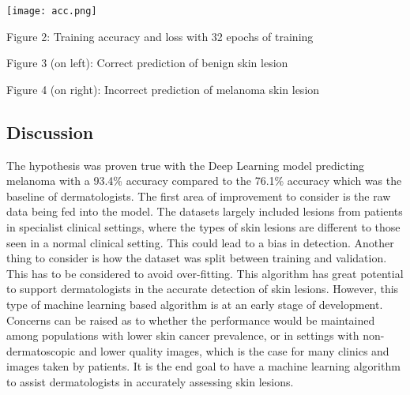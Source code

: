 \documentclass{article}
\begin{document}
\begin{center}
\texttt{[image: acc.png]}
\end{center}
Figure 2: Training accuracy and loss with 32 epochs of training

\vspace{1cm}

\begin{minipage}{16cm}
  \centering
  \hspace*{2cm}
\end{minipage}

\vspace{1cm}

Figure 3 (on left): Correct prediction of benign skin lesion

Figure 4 (on right): Incorrect prediction of melanoma skin lesion

\vspace{0.5cm}

\subsection{Discussion}
The hypothesis was proven true with the Deep Learning model predicting melanoma with a 93.4\% accuracy compared to the 76.1\% accuracy which was the baseline of dermatologists. The first area of improvement to consider is the raw data being fed into the model. The datasets largely included lesions from patients in specialist clinical settings, where the types of skin lesions are different to those seen in a normal clinical setting. This could lead to a bias in detection. Another thing to consider is how the dataset was split between training and validation. This has to be considered to avoid over-fitting. This algorithm has great potential to support dermatologists in the accurate detection of skin lesions. However, this type of machine learning based algorithm is at an early stage of development. Concerns can be raised as to whether the performance would be maintained among populations with lower skin cancer prevalence, or in settings with non-dermatoscopic and lower quality images, which is the case for many clinics and images taken by patients. It is the end goal to have a machine learning algorithm to assist dermatologists in accurately assessing skin lesions.
\end{document}
